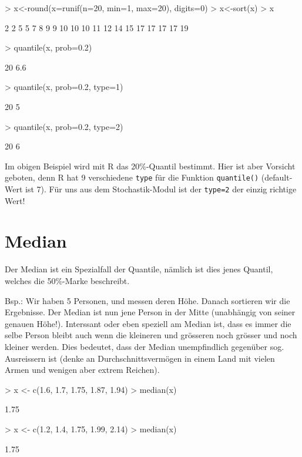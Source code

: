 \begin{Schunk}
\begin{Sinput}
> x<-round(x=runif(n=20, min=1, max=20), digits=0)
> x<-sort(x)
> x
\end{Sinput}
\begin{Soutput}
 [1]  2  2  5  5  7  8  9  9 10 10 10 11 12 14 15 17 17 17 17 19
\end{Soutput}
\begin{Sinput}
> quantile(x, prob=0.2)
\end{Sinput}
\begin{Soutput}
20% 
6.6 
\end{Soutput}
\begin{Sinput}
> quantile(x, prob=0.2, type=1)
\end{Sinput}
\begin{Soutput}
20% 
  5 
\end{Soutput}
\begin{Sinput}
> quantile(x, prob=0.2, type=2)
\end{Sinput}
\begin{Soutput}
20% 
  6 
\end{Soutput}
\end{Schunk}
Im obigen Beispiel wird mit R das 20\%-Quantil bestimmt. Hier ist aber 
Vorsicht geboten, denn R hat 9 verschiedene \verb!type! für die Funktion
\verb!quantile()! (default-Wert ist 7). Für uns aus dem 
Stochastik-Modul ist der \verb!type=2! 
der einzig richtige Wert!

\section{Median}
Der Median ist ein Spezialfall der Quantile, nämlich ist dies jenes Quantil,
welches die 50\%-Marke beschreibt.

Bsp.: Wir haben 5 Personen, und messen deren Höhe. Danach sortieren wir die
Ergebnisse. Der Median ist nun jene Person in der Mitte (unabhängig von seiner
genauen Höhe!). Interssant oder eben speziell am Median ist,
dass es immer die selbe Person bleibt auch wenn die kleineren und grösseren
noch grösser und noch kleiner werden. Dies bedeutet, dass der Median 
unempfindlich gegenüber sog. Ausreissern ist (denke an Durchschnittsvermögen
in einem Land mit vielen Armen und wenigen aber extrem Reichen).
\begin{Schunk}
\begin{Sinput}
> x <- c(1.6, 1.7, 1.75, 1.87, 1.94)
> median(x)
\end{Sinput}
\begin{Soutput}
[1] 1.75
\end{Soutput}
\begin{Sinput}
> x <- c(1.2, 1.4, 1.75, 1.99, 2.14)
> median(x)
\end{Sinput}
\begin{Soutput}
[1] 1.75
\end{Soutput}
\end{Schunk}

